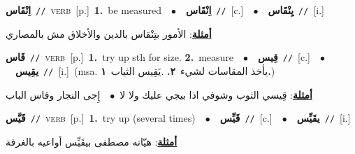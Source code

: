 \documentclass[10pt,a4paper,twoside]{article} %
\begin{document}
\begin{multicols}{2}
{\setlength\topsep{0pt}\textbf{\foreignlanguage{arabic}{اِنْقَاس}}\ {\color{gray}\texttt{//}\color{black}}\ \textsc{verb}\ [p.]\ \textbf{1.}~be measured\ \ $\bullet$\ \ \setlength\topsep{0pt}\textbf{\foreignlanguage{arabic}{اِنْقَاس}}\ {\color{gray}\texttt{//}\color{black}}\ [c.]\ \ $\bullet$\ \ \setlength\topsep{0pt}\textbf{\foreignlanguage{arabic}{يِنْقَاس}}\ {\color{gray}\texttt{//}\color{black}}\ [i.]\  \begin{flushright}\color{gray}\foreignlanguage{arabic}{\textbf{\underline{\foreignlanguage{arabic}{أمثلة}}}: الأمور بتِنْقاس بالدين والأخلاق مش بالمصاري}\end{flushright}\color{black}} \vspace{2mm}

{\setlength\topsep{0pt}\textbf{\foreignlanguage{arabic}{قَاس}}\ {\color{gray}\texttt{//}\color{black}}\ \textsc{verb}\ [p.]\ \textbf{1.}~try up sth for size.  \textbf{2.}~measure\ \ $\bullet$\ \ \setlength\topsep{0pt}\textbf{\foreignlanguage{arabic}{قِيس}}\ {\color{gray}\texttt{//}\color{black}}\ [c.]\ \ $\bullet$\ \ \setlength\topsep{0pt}\textbf{\foreignlanguage{arabic}{يقِيس}}\ {\color{gray}\texttt{//}\color{black}}\ [i.]\ \color{gray}(msa. \foreignlanguage{arabic}{يأخذ المقاسات لشيء}~\foreignlanguage{arabic}{\textbf{٢.}}  .\foreignlanguage{arabic}{يَقِيس الثياب}~\foreignlanguage{arabic}{\textbf{١.}})\color{black}\  \begin{flushright}\color{gray}\foreignlanguage{arabic}{\textbf{\underline{\foreignlanguage{arabic}{أمثلة}}}: قِيسي الثوب وشوفي اذا بيجي عليك ولا لا\ $\bullet$\ \  إِجى النجار وقاس الباب}\end{flushright}\color{black}} \vspace{2mm}

{\setlength\topsep{0pt}\textbf{\foreignlanguage{arabic}{قَيَّس}}\ {\color{gray}\texttt{//}\color{black}}\ \textsc{verb}\ [p.]\ \textbf{1.}~try up (several times)\ \ $\bullet$\ \ \setlength\topsep{0pt}\textbf{\foreignlanguage{arabic}{قَيِّس}}\ {\color{gray}\texttt{//}\color{black}}\ [c.]\ \ $\bullet$\ \ \setlength\topsep{0pt}\textbf{\foreignlanguage{arabic}{يقَيِّس}}\ {\color{gray}\texttt{//}\color{black}}\ [i.]\  \begin{flushright}\color{gray}\foreignlanguage{arabic}{\textbf{\underline{\foreignlanguage{arabic}{أمثلة}}}: هيّاته مصطفى بيقَيِّس أواعيه بالغرفة}\end{flushright}\color{black}} \vspace{2mm}


\end{multicols}
\end{document}
